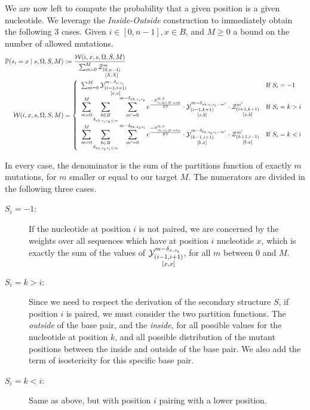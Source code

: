 We are now left to compute the probability that a given position is a given nucleotide.
We leverage the \emph{Inside-Outside} construction to immediately obtain the following $3$ cases.
Given $i\in[0,n-1],x\in B$, and $M\geq 0$ a bound on the number of allowed mutations. 
\begin{align}
	\mathbb{P}(s_i = x\mid s,\Omega, S,M) &:= \frac{\mathcal{W}(i,x,s,\Omega,S,M)}{\sum_{m=0}^{M}\Z{0,n-1}{m}{X,X}}\label{eq:normalize}\\ 
\mathcal{W}(i,x,s,\Omega,S,M)&=
 \left\{
	\begin{array}{ll}
			\sum_{m=0}^{M}
			\Y{i-1,i+1}{m-\Kron_{x,s_i}}{x,x}
		&\text{If }S_i = -1\\
			\displaystyle
			\sum_{m=0}^{M}
			\sum_{\substack{b\in B\\\Kron_{xb,s_is_k\leq m}}}
			\sum_{m'=0}^{m-\Kron_{xb,s_is_k}}
     	 e^{\frac{-E_{(i,k),\varnothing\to xb}^{\Omega,\beta} }{RT}}
			\cdot\Y{i-1,k+1}{m-\Kron_{xb,s_is_k-m'}}{x,b}
			\cdot\Z{i+1,k-1}{m'}{x,b}
		&\text{If }S_i=k>i\\
    \displaystyle
			\sum_{m=0}^{M}
			\sum_{\substack{b\in B\\\Kron_{bx,s_ks_i\leq m}}}
			\sum_{m'=0}^{m-\Kron_{bx,s_ks_i}}
     	 e^{\frac{-E^{\Omega, \beta}_{(k,i),\varnothing\to bx}}{RT}}
			\cdot\Y{k-1,i+1}{m-\Kron_{bx,s_ks_i-m'}}{b,x}
			\cdot\Z{k+1,i-1}{m'}{b,x}
		&\text{If }S_i=k<i
	\end{array}\right.\label{eq:combine}
\end{align}

In every case, the denominator is the sum of the partitions function of exactly $m$ mutations, 
for $m$ smaller or equal to our target $M$. The numerators are divided in the following three cases.
\begin{description}
\item[$S_i=-1$:] If the nucleotide at position $i$ is not paired, we are concerned by the weights
over all sequences which have at position $i$ nucleotide $x$, which is exactly the sum
of the values of $\Y{i-1,i+1}{m-\Kron_{x,s_i}}{x,x}$, for all $m$ between $0$ and $M$.
\item[$S_i=k>i$:] Since we need to respect the derivation of the secondary structure $S$, if 
position $i$ is paired, we must consider the two partition functions. The \emph{outside} of the 
base pair, and the \emph{inside}, for all possible values for the nucleotide at position $k$, and
all possible distribution of the mutant positions between the inside and outside of the base pair. We also add the term of isostericity for this specific base pair.
\item[$S_i=k<i$:] Same as above, but with position $i$ pairing with a lower position.
\end{description}

